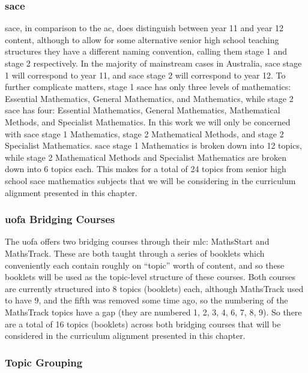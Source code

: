 \documentclass[twoside,12pt,a4paper]{report}
\begin{document}
\subsubsection{\gls{sace}}

\gls{sace}, in comparison to the \gls{ac}, does distinguish between year 11 and year 12 content, although to allow for some alternative senior high school teaching structures they have a different naming convention, calling them stage 1 and stage 2 respectively. In the majority of mainstream cases in Australia, \gls{sace} stage 1 will correspond to year 11, and \gls{sace} stage 2 will correspond to year 12. To further complicate matters, stage 1 \gls{sace} has only three levels of mathematics: Essential Mathematics, General Mathematics, and Mathematics, while stage 2 \gls{sace} has four: Essential Mathematics, General Mathematics, Mathematical Methods, and Specialist Mathematics. In this work we will only be concerned with \gls{sace} stage 1 Mathematics, stage 2 Mathematical Methods, and stage 2 Specialist Mathematics. \gls{sace} stage 1 Mathematics is broken down into 12 topics, while stage 2 Mathematical Methods and Specialist Mathematics are broken down into 6 topics each. This makes for a total of 24 topics from senior high school \gls{sace} mathematics subjects that we will be considering in the curriculum alignment presented in this chapter.

\subsubsection{\gls{uofa} Bridging Courses}

The \gls{uofa} offers two bridging courses through their \gls{mlc}: MathsStart and MathsTrack. These are both taught through a series of booklets which conveniently each contain roughly on ``topic'' worth of content, and so these booklets will be used as the topic-level structure of these courses. Both courses are currently structured into 8 topics (booklets) each, although MathsTrack used to have 9, and the fifth was removed some time ago, so the numbering of the MathsTrack topics have a gap (they are numbered 1, 2, 3, 4, 6, 7, 8, 9). So there are a total of 16 topics (booklets) across both bridging courses that will be considered in the curriculum alignment presented in this chapter.

\subsubsection{Topic Grouping}
\end{document}

